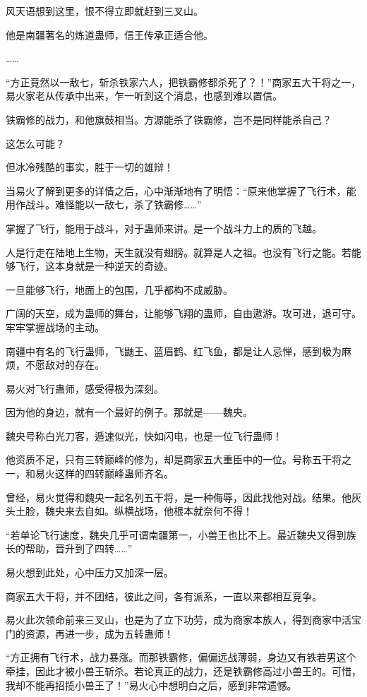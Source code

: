 \begin{this_body}
风天语想到这里，恨不得立即就赶到三叉山。

他是南疆著名的炼道蛊师，信王传承正适合他。

……

“方正竟然以一敌七，斩杀铁家六人，把铁霸修都杀死了？！”商家五大干将之一，易火家老从传承中出来，乍一听到这个消息，也感到难以置信。

铁霸修的战力，和他旗鼓相当。方源能杀了铁霸修，岂不是同样能杀自己？

这怎么可能？

但冰冷残酷的事实，胜于一切的雄辩！

当易火了解到更多的详情之后，心中渐渐地有了明悟：“原来他掌握了飞行术，能用作战斗。难怪能以一敌七，杀了铁霸修……”

掌握了飞行，能用于战斗，对于蛊师来讲。是一个战斗力上的质的飞越。

人是行走在陆地上生物，天生就没有翅膀。就算是人之祖。也没有飞行之能。若能够飞行，这本身就是一种逆天的奇迹。

一旦能够飞行，地面上的包围，几乎都构不成威胁。

广阔的天空，成为蛊师的舞台，让能够飞翔的蛊师，自由遨游。攻可进，退可守。牢牢掌握战场的主动。

南疆中有名的飞行蛊师，飞鼬王、蓝眉鹤、红飞鱼，都是让人忌惮，感到极为麻烦，不愿敌对的存在。

易火对飞行蛊师，感受得极为深刻。

因为他的身边，就有一个最好的例子。那就是——魏央。

魏央号称白光刀客，遁速似光，快如闪电，也是一位飞行蛊师！

他资质不足，只有三转巅峰的修为，却是商家五大重臣中的一位。号称五干将之一，和易火这样的四转巅峰蛊师齐名。

曾经，易火觉得和魏央一起名列五干将，是一种侮辱，因此找他对战。结果。他灰头土脸，魏央来去自如。纵横战场，他根本就奈何不得！

“若单论飞行速度，魏央几乎可谓南疆第一，小兽王也比不上。最近魏央又得到族长的帮助，晋升到了四转……”

易火想到此处，心中压力又加深一层。

商家五大干将，并不团结，彼此之间，各有派系，一直以来都相互竞争。

易火此次领命前来三叉山，也是为了立下功劳，成为商家本族人，得到商家中活宝门的资源，再进一步，成为五转蛊师！

“方正拥有飞行术，战力暴涨。而那铁霸修，偏偏远战薄弱，身边又有铁若男这个牵挂，因此才被小兽王斩杀。若论真正的战力，还是铁霸修高过小兽王的。可惜，我却不能再招揽小兽王了！”易火心中想明白之后，感到非常遗憾。


\end{this_body}
